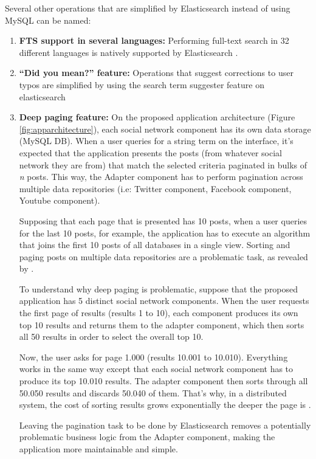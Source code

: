Several other operations that are simplified by Elasticsearch instead of using MySQL can be named: 
\begin{enumerate}
\item{\textbf{FTS support in several languages:} Performing full-text search in 32 different languages is natively supported by Elasticsearch \cite{eslanguageanalyzers}.}
\item{\textbf{``Did you mean?'' feature:} Operations that suggest corrections to user typos are simplified by using the search term suggester feature on elasticsearch\cite{termsuggester}}
\item{\textbf{Deep paging feature:} On the proposed application architecture (Figure \ref{fig:apparchitecture}), each social network component has its own data storage (MySQL DB). When a user queries for a string term on the interface, it's expected that the application presents the posts (from whatever social network they are from) that match the selected criteria paginated in bulks of \textit{n} posts. This way, the Adapter component has to perform pagination across multiple data repositories (i.e: Twitter component, Facebook component, Youtube component). 

Supposing that each page that is presented has 10 posts, when a user queries for the last 10 posts, for example, the application has to execute an algorithm that joins the first 10 posts of all databases in a single view. Sorting and paging posts on multiple data repositories are a problematic task, as revealed by \cite{paginationES}.

To understand why deep paging is problematic, suppose that the proposed application has 5 distinct social network components. When the user requests the first page of results (results 1 to 10), each component produces its own top 10 results and returns them to the adapter component, which then sorts all 50 results in order to select the overall top 10.

Now, the user asks for page 1.000 (results 10.001 to 10.010). Everything works in the same way except that each social network component has to produce its top 10.010 results. The adapter component then sorts through all 50.050 results and discards 50.040 of them. That's why, in a distributed system, the cost of sorting results grows exponentially the deeper the page is \cite{paginationES}.

Leaving the pagination task to be done by Elasticsearch removes a potentially problematic business logic from the Adapter component, making the application more maintainable and simple.

}

\end{enumerate}

